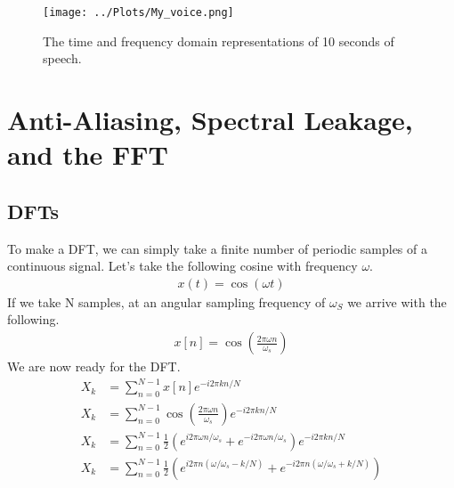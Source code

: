 \documentclass[twocolumn]{myarticle}
\begin{document}
\begin{figure*}[htpb]
    \centering
    \texttt{[image: ../Plots/My\_voice.png]}
    \caption{The time and frequency domain representations of 10 seconds of speech.}
    \label{fig:my_voice}
\end{figure*}


\section{Anti-Aliasing, Spectral Leakage, and the FFT}
\label{sec:anti_aliasing_spectral_leakage_and_the_fft}

\subsection{DFTs}
\label{subsec:dfts}

To make a DFT, we can simply take a finite number of periodic samples of a continuous signal. 
Let's take the following cosine with frequency $\omega$.
\begin{align}
    x(t)=\cos\left(\omega t\right)
\end{align}
If we take N samples, at an angular sampling frequency of $\omega_{S}$ we arrive with the following.
\begin{align}
    x[n]=\cos\left( \frac{2 \pi \omega n}{\omega_{s}}\right)
\end{align}
We are now ready for the DFT.
\begin{align}
    X_{k} &= \sum^{N-1}_{n=0}x[n]e^{-i 2\pi k n/N} 
    \\
    X_{k} &= \sum^{N-1}_{n=0}\cos\left(\frac{2 \pi \omega n}{\omega_{s}}\right) e^{-i 2\pi kn/N}
    \\
    X_{k} &= \sum^{N-1}_{n=0} \frac{1}{2} \left( e^{i 2 \pi \omega n / \omega_s} + e^{-i 2 \pi \omega n / \omega_s} \right) e^{-i 2\pi kn/N}
    \\
    X_{k} &= \sum^{N-1}_{n=0} \frac{1}{2} \left( e^{i 2 \pi n (\omega/\omega_s - k/N)} + e^{-i 2 \pi n (\omega / \omega_s + k/N)} \right)
\end{align}
\end{document}
